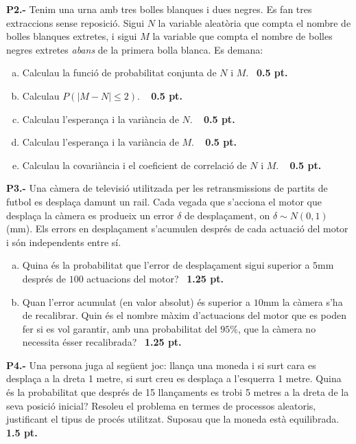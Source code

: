 \documentclass{report}
\begin{document}
\noindent\textbf{P2.-}
Tenim una urna amb tres bolles blanques i dues negres. Es fan tres extraccions sense reposici\'o.
Sigui $N$ la variable aleat\`oria que compta el nombre de bolles blanques extretes, i sigui
$M$ la variable que compta el nombre de bolles negres extretes {\it abans} de la primera bolla blanca.
Es demana:
\begin{enumerate}[a)]
\item Calculau la funci\'o de probabilitat conjunta de $N$ i $M$.\ \hfill{\textbf{ 0.5 pt.}}
\item Calculau $P(|M-N|\leq 2)$. \ \hfill{\textbf{ 0.5 pt.}}
\item Calculau l'esperan\c{c}a i la vari\`ancia de $N$. \ \hfill{\textbf{ 0.5 pt.}}
\item Calculau l'esperan\c{c}a i la vari\`ancia de $M$. \ \hfill{\textbf{ 0.5 pt.}}
\item Calculau la covari\`ancia i el coeficient de correlaci\'o de $N$ i $M$. \ \hfill{\textbf{ 0.5 pt.}}
\end{enumerate}


\vspace{0.5 cm}


\noindent\textbf{P3.-} Una càmera de televisió utilitzada per les retransmissions de partits de futbol
es desplaça damunt un rail. Cada vegada que s'acciona el motor que desplaça la càmera es produeix 
un error $\delta$ de desplaçament, on $\delta \sim N(0, 1)$ (mm). Els errors en
desplaçament s'acumulen despr\'es de cada actuaci\'o del motor i s\'on independents entre s\'i.
\begin{enumerate}[a)]
\item Quina \'es la probabilitat que l'error de desplaçament sigui superior a $5$mm despr\'es de
$100$ actuacions del motor?\ \hfill{\textbf{ 1.25 pt.}}
\item Quan l'error acumulat (en valor absolut) \'es superior a $10$mm la càmera s'ha de recalibrar.
Quin \'es el nombre m\`axim d'actuacions del motor que es poden fer si es vol garantir, amb una
probabilitat del $95\%$, que la càmera no necessita \'esser recalibrada?\ \hfill{\textbf{ 1.25 pt.}}
\end{enumerate}



\vspace{0.5 cm}

\noindent\textbf{P4.-} Una persona juga al següent joc: llança una moneda i si surt cara es desplaça a
la dreta 1 metre, si surt creu es desplaça a l'esquerra 1 metre. Quina és la probabilitat que després
de 15 llançaments es trobi 5 metres a la dreta de la seva posició inicial?
\noindent
Resoleu el problema en termes de processos aleatoris, justificant el tipus de procés utilitzat.
\noindent
Suposau que la moneda està equilibrada.\ \hfill{\textbf{ 1.5 pt.}}
\end{document}
